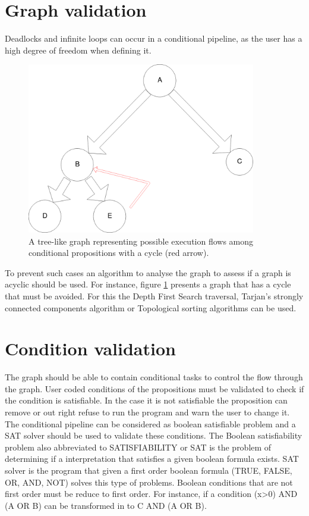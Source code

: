 \section{Graph validation}

Deadlocks and infinite loops can occur in a conditional pipeline, as the user has a high degree of freedom when defining it.

\begin{figure}[h]
\begin{center}
\includegraphics[width=10cm]{latex/img/CiclicGraph}
\end{center}
\caption{A tree-like graph representing possible execution flows among conditional propositions with a cycle (red arrow).}
\label{fig:graph}
\end{figure}

To prevent such cases an algorithm to analyse the graph to assess if a graph is acyclic should be used.
For instance, figure \ref{fig:graph} presents a graph that has a cycle that must be avoided.
For this the Depth First Search traversal, Tarjan's strongly connected components algorithm or Topological sorting algorithms can be used.

\section{Condition validation}
The graph should be able to contain conditional tasks to control the flow through the graph.
User coded conditions of the propositions must be validated to check if the condition is satisfiable.
In the case it is not satisfiable the proposition can remove or out right refuse to run the program and warn the user to change it.
The conditional pipeline can be considered as boolean satisfiable problem and a SAT solver should be used to validate these conditions.
The Boolean satisfiability problem also abbreviated to SATISFIABILITY or SAT is the problem of determining if a interpretation that satisfies a given boolean formula exists. 
SAT solver is the program that given a first order boolean formula (TRUE, FALSE, OR, AND, NOT)  solves this type of problems.
Boolean conditions that are not first order must be reduce to first order. For instance, if a condition (x>0) AND (A OR B) can be transformed in to C AND (A OR B). 


